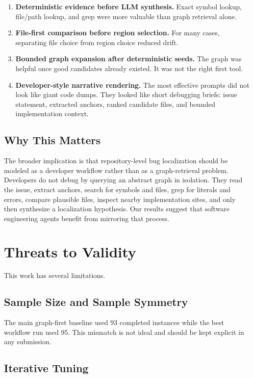 \documentclass[11pt]{article}
\begin{document}
\begin{enumerate}
\item \textbf{Deterministic evidence before LLM synthesis.} Exact symbol lookup, file/path lookup, and grep were more valuable than graph retrieval alone.
\item \textbf{File-first comparison before region selection.} For many cases, separating file choice from region choice reduced drift.
\item \textbf{Bounded graph expansion after deterministic seeds.} The graph was helpful once good candidates already existed. It was not the right first tool.
\item \textbf{Developer-style narrative rendering.} The most effective prompts did not look like giant code dumps. They looked like short debugging briefs: issue statement, extracted anchors, ranked candidate files, and bounded implementation context.
\end{enumerate}

\subsection{Why This Matters}

The broader implication is that repository-level bug localization should be modeled as a developer workflow rather than as a graph-retrieval problem. Developers do not debug by querying an abstract graph in isolation. They read the issue, extract anchors, search for symbols and files, grep for literals and errors, compare plausible files, inspect nearby implementation sites, and only then synthesize a localization hypothesis. Our results suggest that software engineering agents benefit from mirroring that process.

\section{Threats to Validity}

This work has several limitations.

\subsection{Sample Size and Sample Symmetry}

The main graph-first baseline used 93 completed instances while the best workflow run used 95. This mismatch is not ideal and should be kept explicit in any submission.

\subsection{Iterative Tuning}
\end{document}

